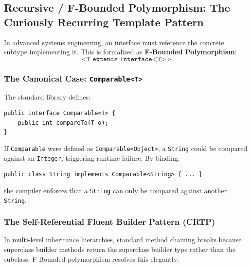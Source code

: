 \documentclass[10pt,journal,compsoc,onecolumn]{IEEEtran}
\begin{document}
\subsection{Recursive / F-Bounded Polymorphism: The Curiously Recurring Template Pattern}
In advanced systems engineering, an interface must reference the concrete subtype implementing it. This is formalized as \textbf{F-Bounded Polymorphism}:
\begin{equation}
\texttt{<T extends Interface<T>>}
\end{equation}

\subsubsection{The Canonical Case: \texttt{Comparable<T>}}
The standard library defines:
\begin{lstlisting}
public interface Comparable<T> {
    public int compareTo(T o);
}
\end{lstlisting}
If \texttt{Comparable} were defined as \texttt{Comparable<Object>}, a \texttt{String} could be compared against an \texttt{Integer}, triggering runtime failure. By binding:
\begin{lstlisting}
public class String implements Comparable<String> { ... }
\end{lstlisting}
the compiler enforces that a \texttt{String} can only be compared against another \texttt{String}.

\subsubsection{The Self-Referential Fluent Builder Pattern (CRTP)}
In multi-level inheritance hierarchies, standard method chaining breaks because superclass builder methods return the superclass builder type rather than the subclass. F-Bounded polymorphism resolves this elegantly:
\end{document}
